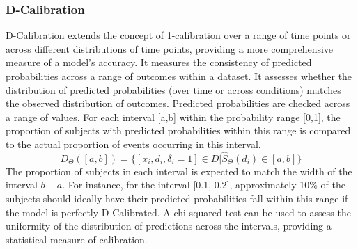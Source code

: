 \subsubsection{D-Calibration}
\noindent D-Calibration \parencite{haider_effective_2018} extends the concept of 1-calibration over a range of time points or across different distributions of time points, providing a more comprehensive measure of a model's accuracy. It measures the consistency of predicted probabilities across a range of outcomes within a dataset. It assesses whether the distribution of predicted probabilities (over time or across conditions) matches the observed distribution of outcomes. Predicted probabilities are checked across a range of values. For each interval [a,b] within the probability range [0,1], the proportion of subjects with predicted probabilities within this range is compared to the actual proportion of events occurring in this interval.
\begin{equation} \label{eq:dc}D_{\Theta}([a, b]) = \{[x_i, d_i, \delta_i = 1] \in D | \hat{S}_{\Theta}(d_i) \in [a, b]\}\end{equation}
\noindent The proportion of subjects in each interval is expected to match the width of the interval \(b-a\). For instance, for the interval [0.1, 0.2], approximately 10\% of the subjects should ideally have their predicted probabilities fall within this range if the model is perfectly D-Calibrated. A chi-squared test can be used to assess the uniformity of the distribution of predictions across the intervals, providing a statistical measure of calibration.

